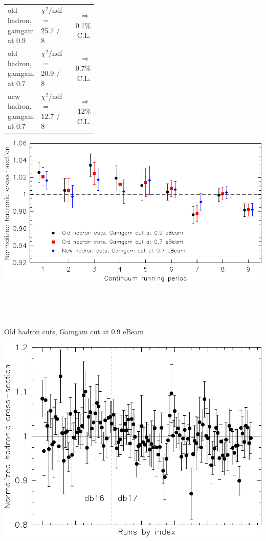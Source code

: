 \documentclass[landscape]{article}
\newenvironment{slide}{\mbox{ }\vfill}{\vfill \mbox{ } \pagebreak}
\begin{document}
\begin{slide}
  \begin{center}
    \begin{tabular}{p{0.35\linewidth} l r}
      old hadron, gamgam at 0.9 & $\chi^2/$ndf $=$ 25.7 / 8 & $\Rightarrow$ 0.1\% C.L. \\
      old hadron, gamgam at 0.7 & $\chi^2/$ndf $=$ 20.9 / 8 & $\Rightarrow$ 0.7\% C.L. \\
      new hadron, gamgam at 0.7 & $\chi^2/$ndf $=$ 12.7 / 8 & $\Rightarrow$ 12\% C.L.
    \end{tabular}

    \vfill \includegraphics[width=\linewidth]{prepforpta4.pdf}
  \end{center}
\end{slide}

\begin{slide}
  \begin{center}
    \vfill
    Old hadron cuts, Gamgam cut at 0.9 eBeam

    \vfill
    \includegraphics[width=0.85\linewidth]{prepforpta3_oldhadronalloldgam.pdf}
  \end{center}
\end{slide}
\end{document}
